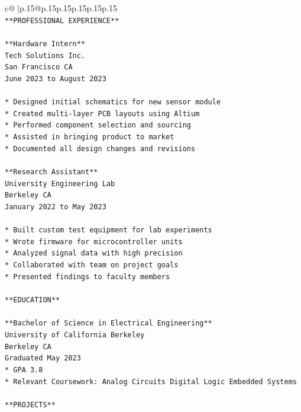 \documentclass{article}
\begin{document}
{\begin{supertabular}{c@{$\;$}|p{.15\linewidth}@{}p{.15\linewidth}p{.15\linewidth}p{.15\linewidth}p{.15\linewidth}p{.15\linewidth}}
{{{\\ 
\texttt{**PROFESSIONAL EXPERIENCE**} \\
\\ 
\texttt{**Hardware Intern**} \\
\texttt{Tech Solutions Inc.} \\
\texttt{San Francisco CA} \\
\texttt{June 2023 to August 2023} \\
\\ 
\texttt{*   Designed initial schematics for new sensor module} \\
\texttt{*   Created multi{-}layer PCB layouts using Altium} \\
\texttt{*   Performed component selection and sourcing} \\
\texttt{*   Assisted in bringing product to market} \\
\texttt{*   Documented all design changes and revisions} \\
\\ 
\texttt{**Research Assistant**} \\
\texttt{University Engineering Lab} \\
\texttt{Berkeley CA} \\
\texttt{January 2022 to May 2023} \\
\\ 
\texttt{*   Built custom test equipment for lab experiments} \\
\texttt{*   Wrote firmware for microcontroller units} \\
\texttt{*   Analyzed signal data with high precision} \\
\texttt{*   Collaborated with team on project goals} \\
\texttt{*   Presented findings to faculty members} \\
\\ 
\texttt{**EDUCATION**} \\
\\ 
\texttt{**Bachelor of Science in Electrical Engineering**} \\
\texttt{University of California Berkeley} \\
\texttt{Berkeley CA} \\
\texttt{Graduated May 2023} \\
\texttt{*   GPA 3.8} \\
\texttt{*   Relevant Coursework: Analog Circuits Digital Logic Embedded Systems} \\
\\ 
\texttt{**PROJECTS**} \\
}}}
\end{supertabular}}
\end{document}
